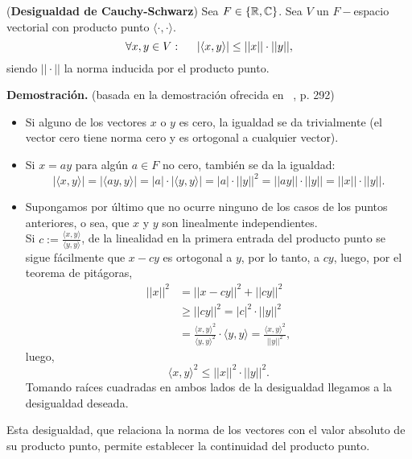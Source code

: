 \begin{teo}
(\textbf{Desigualdad de Cauchy-Schwarz}) \label{Teo:CauchySchwarz}
Sea $F \in \{ \mathbb{R}, \mathbb{C} \}$.
Sea $V$ un $F-$espacio vectorial con producto punto 
$ \langle \cdot  , \cdot  \rangle$.
\begin{equation}
\label{eq0: 12Feb}
\forall x , y \in V : \hspace{0.5cm}
|\langle x , y \rangle | \leq ||x|| \cdot ||y||,
\end{equation}
siendo $|| \cdot ||$
la norma inducida por el producto punto.
\end{teo}
\noindent
\textbf{Demostración.}
(basada en la demostración
ofrecida en ~\cite{Lang}, p. 292)
\begin{itemize}
\item Si alguno de los vectores $x$ o $y$ es cero,
la igualdad se da trivialmente (el vector cero tiene norma
cero y es ortogonal a cualquier vector). 

\item Si $x=a y$ para algún $a \in F$ no cero, también se 
da la igualdad:
\[
|\langle  x , y \rangle | =
|\langle  ay , y \rangle | = |a| \cdot  |\langle  y , y \rangle | =  
 |a| \cdot ||y||^{2}
=||ay|| \cdot ||y|| = ||x|| \cdot ||y||.
\]
\item Supongamos por último que no ocurre ninguno
de los casos de los puntos anteriores, o sea, que
$x$ y $y$ son linealmente independientes. \\
Si $c:=\frac{\langle x , y \rangle}{\langle y , y \rangle}$,
de la linealidad en la primera entrada
del producto punto se sigue fácilmente que
$x - cy$ es ortogonal a $y$, por lo tanto, a $cy$,
luego, 
por el teorema de pitágoras,
\begin{align*}
||x||^{2} & = ||x-cy||^{2} + ||cy||^{2} \\
& \geq ||cy||^{2}= |c|^{2} \cdot ||y||^{2} \\
& = \frac{\langle x , y \rangle ^{2}}{\langle y , y \rangle ^{2}} \cdot\langle y , y \rangle
= \frac{\langle x , y \rangle ^{2}}{|| y ||^{2}},
\end{align*}
luego, 
\[
\langle x, y \rangle ^{2}  \leq ||x||^{2} \cdot ||y||^{2}.
\]
Tomando raíces cuadradas en ambos lados de la
desigualdad llegamos a la desigualdad deseada. \QEDB
\end{itemize}
\vspace{0.2cm}


Esta desigualdad, que relaciona la norma de los
vectores con el valor
absoluto de su producto punto, permite
establecer la continuidad del producto punto. \\


